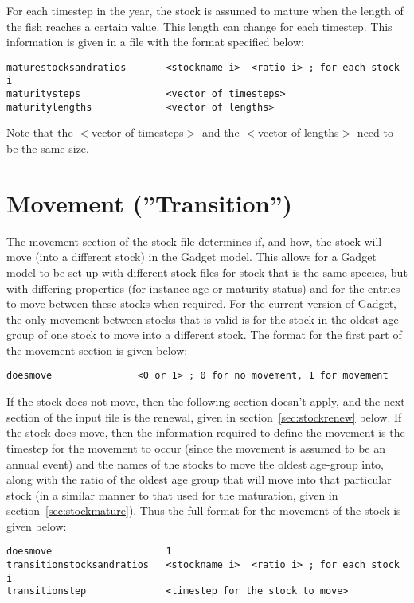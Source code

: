 \documentclass [a4paper, 10pt]{book}
\begin{document}
For each timestep in the year, the stock is assumed to mature when the length of the fish reaches a certain value.  This length can change for each timestep.  This information is given in a file with the format specified below:

{\small\begin{verbatim}
maturestocksandratios       <stockname i>  <ratio i> ; for each stock i
maturitysteps               <vector of timesteps>
maturitylengths             <vector of lengths>
\end{verbatim}}

Note that the $<$vector of timesteps$>$ and the $<$vector of lengths$>$ need to be the same size.

\section{Movement (''Transition'')}\label{sec:stockmove}
The movement section of the stock file determines if, and how, the stock will move (into a different stock) in the Gadget model.  This allows for a Gadget model to be set up with different stock files for stock that is the same species, but with differing properties (for instance age or maturity status) and for the entries to move between these stocks when required.  For the current version of Gadget, the only movement between stocks that is valid is for the stock in the oldest age-group of one stock to move into a different stock.  The format for the first part of the movement section is given below:

{\small\begin{verbatim}
doesmove               <0 or 1> ; 0 for no movement, 1 for movement
\end{verbatim}}

If the stock does not move, then the following section doesn't apply, and the next section of the input file is the renewal, given in section~\ref{sec:stockrenew} below.  If the stock does move, then the information required to define the movement is the timestep for the movement to occur (since the movement is assumed to be an annual event) and the names of the stocks to move the oldest age-group into, along with the ratio of the oldest age group that will move into that particular stock (in a similar manner to that used for the maturation, given in section~\ref{sec:stockmature}).  Thus the full format for the movement of the stock is given below:

{\small\begin{verbatim}
doesmove                    1
transitionstocksandratios   <stockname i>  <ratio i> ; for each stock i
transitionstep              <timestep for the stock to move>
\end{verbatim}}
\end{document}

